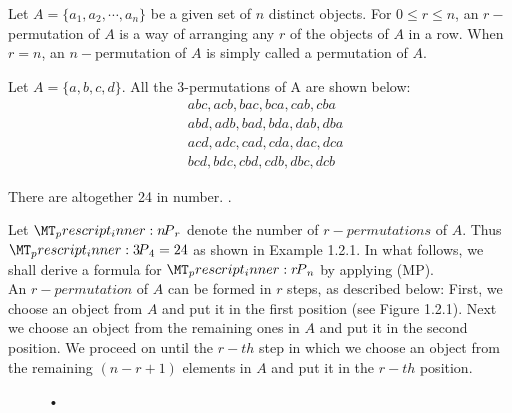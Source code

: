 \documentclass[a4paper,11pt]{book}
\newcommand\perm[2][^n]{\prescript{#1\mkern-2.5mu}{}P_{#2}}
\begin{document}
Let $A = \{a_1, a_2,\cdots, a_n\}$ be a given set of $n$ distinct objects. For $0 \le r \le n$, an $r-$permutation of $A$ is a way of arranging any $r$ of the objects of $A$ in a row. When $r = n$, an $n-$permutation of $A$ is simply called a permutation of $A$. 
\begin{example}
Let $A = \{a, b, c, d\}$. All the 3-permutations of A are shown below: 
\begin{align*}
& abc, acb, bac, bca, cab, cba\\
& abd, adb, bad, bda, dab, dba \\
& acd, adc, cad, cda,  dac, dca \\ 
& bcd, bdc, cbd, cdb, dbc, dcb
\end{align*}

There are altogether 24 in number. . 
\end{example}
Let $\perm[n]{r}$ denote the number of $r-permutations$ of $A$. Thus $\perm[3]{4} = 24$ as shown in Example 1.2.1. In what follows, we shall derive a formula for $\perm[r]{n}$  by applying (MP). \\

An $r-permutation$ of $A$ can be formed in $r$ steps, as described below: 
First, we choose an object from $A$ and put it in the first position (see 
Figure 1.2.1). Next we choose an object from the remaining ones in $A$ and 
put it in the second position. We proceed on until the $r-{th}$ step in which we choose an object from the remaining $(n - r + 1)$ elements in $A$ and put it in the $r-{th}$ position. \\

\begin{figure}[h]
\begin{center}
\end{center}
\caption{•}
\end{figure}
\end{document}
